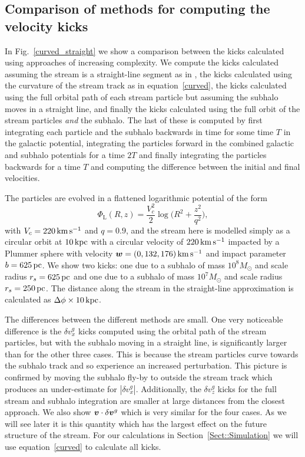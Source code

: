 \documentclass[useAMS,usenatbib,fleqn,a4paper]{mn2e}
\def\kpc{\,{\rm kpc}}
\def\pc{\,{\rm pc}}
\def\kms{\,{\rm km\,s^{-1}}}
\newcommand{\bs}[1]{\bmath{#1}}
\begin{document}
\subsection{Comparison of methods for computing the velocity kicks}
In Fig.~\ref{curved_straight} we show a comparison between the kicks calculated using approaches of increasing complexity. We compute the kicks calculated assuming the stream is a straight-line segment as in \cite{ErkalBelokurov2015}, the kicks calculated using the curvature of the stream track as in equation~\eqref{curved}, the kicks calculated using the full orbital path of each stream particle but assuming the subhalo moves in a straight line, and finally the kicks calculated using the full orbit of the stream particles \emph{and} the subhalo. The last of these is computed by first integrating each particle and the subhalo backwards in time for some time $T$ in the galactic potential, integrating the particles forward in the combined galactic and subhalo potentials for a time $2T$ and finally integrating the particles backwards for a time $T$ and computing the difference between the initial and final velocities.

The particles are evolved in a flattened logarithmic potential of the form
\begin{equation}
\Phi_\mathrm{L}(R,z) = \frac{V_c^2}{2}\log\Big(R^2+\frac{z^2}{q^2}\Big),
\label{potential}
\end{equation}
with $V_c = 220\kms$ and $q = 0.9$, and the stream here is modelled simply as a circular orbit at $10\kpc$ with a circular velocity of $220\kms$ impacted by a Plummer sphere with velocity $\bs{w}=(0,132,176)\kms$ and impact parameter $b=625\pc$. We show two kicks: one due to a subhalo of mass $10^8M_\odot$ and scale radius $r_s=625\pc$ and one due to a subhalo of mass $10^7M_\odot$ and scale radius $r_s=250\pc$. The distance along the stream in the straight-line approximation is calculated as $\Delta\phi\times10\kpc$.

The differences between the different methods are small. One very noticeable difference is the $\delta v^g_x$ kicks computed using the orbital path of the stream particles, but with the subhalo moving in a straight line, is significantly larger than for the other three cases. This is because the stream particles curve towards the subhalo track and so experience an increased perturbation. This picture is confirmed by moving the subhalo fly-by to outside the stream track which produces an under-estimate for $|\delta v^g_x|$. Additionally, the $\delta v^g_z$ kicks for the full stream and subhalo integration are smaller at large distances from the closest approach. We also show $\bs{v}\cdot\delta\bs{v}^g$ which is very similar for the four cases. As we will see later it is this quantity which has the largest effect on the future structure of the stream. For our calculations in Section~\ref{Sect::Simulation} we will use equation~\eqref{curved} to calculate all kicks.
\end{document}
